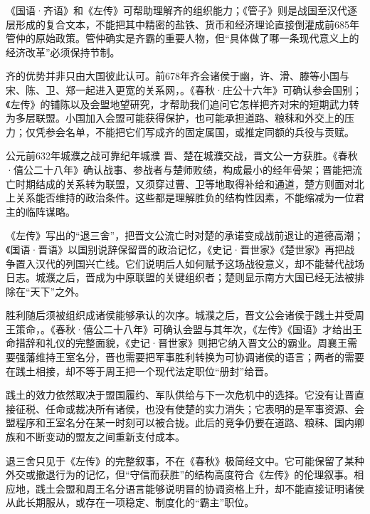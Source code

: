 \begin{debate}[管仲改革能不能全信《管子》]
《国语·齐语》和《左传》可帮助理解齐的组织能力；《管子》则是战国至汉代逐层形成的复合文本，不能把其中精密的盐铁、货币和经济理论直接倒灌成前685年管仲的原始政策。管仲确实是齐霸的重要人物，但“具体做了哪一条现代意义上的经济改革”必须保持节制。
\end{debate}

齐的优势并非只由大国彼此认可。前678年齐会诸侯于幽，许、滑、滕等小国与宋、陈、卫、郑一起进入更宽的关系网，。《春秋·庄公十六年》可确认参会国别；《左传》的铺陈以及会盟地望研究，才帮助我们追问它怎样把齐对宋的短期武力转为多层联盟。小国加入会盟可能获得保护，也可能承担道路、粮秣和外交上的压力；仅凭参会名单，不能把它们写成齐的固定属国，或推定同额的兵役与贡赋。

\begin{event}{公元前632年}{城濮之战}{可靠纪年}{城濮}
晋、楚在城濮交战，晋文公一方获胜。《春秋·僖公二十八年》确认战事、参战者与楚师败绩，构成最小的经年骨架；晋能把流亡时期结成的关系转为联盟，又须穿过曹、卫等地取得补给和通道，楚方则面对北上关系能否维持的政治条件。这些都是理解胜负的结构性因素，不能缩减为一位君主的临阵谋略。

《左传》写出的“退三舍”，把晋文公流亡时对楚的承诺变成战前退让的道德高潮；《国语·晋语》以国别说辞保留晋的政治记忆，《史记·晋世家》《楚世家》再把战争置入汉代的列国兴亡线。它们说明后人如何赋予这场战役意义，却不能替代战场日志。城濮之后，晋成为中原联盟的关键组织者；楚则显示南方大国已经无法被排除在“天下”之外。
\end{event}

胜利随后须被组织成诸侯能够承认的次序。城濮之后，晋文公会诸侯于践土并受周王策命，。《春秋·僖公二十八年》可确认会盟与其年次，《左传》《国语》才给出王命措辞和礼仪的完整面貌，《史记·晋世家》则把它纳入晋文公的霸业。周襄王需要强藩维持王室名分，晋也需要把军事胜利转换为可协调诸侯的语言；两者的需要在践土相接，却不等于周王把一个现代法定职位“册封”给晋。

践土的效力依然取决于盟国履约、军队供给与下一次危机中的选择。它没有让晋直接征税、任命或裁决所有诸侯，也没有使楚的实力消失；它表明的是军事资源、会盟程序和王室名分在某一时刻可以被合拢。此后的竞争仍要在道路、粮秣、国内卿族和不断变动的盟友之间重新支付成本。

\begin{debate}
退三舍只见于《左传》的完整叙事，不在《春秋》极简经文中。它可能保留了某种外交或撤退行为的记忆，但“守信而获胜”的结构高度符合《左传》的伦理叙事。相应地，践土会盟和周王名分语言能够说明晋的协调资格上升，却不能直接证明诸侯从此长期服从，或存在一项稳定、制度化的“霸主”职位。
\end{debate}


